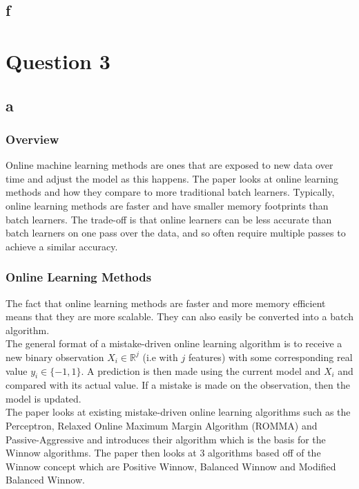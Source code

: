 \documentclass{article}
\begin{document}
\subsection*{f}

\newpage
\section*{Question 3}

\subsection*{a}

\subsubsection*{Overview}

Online machine learning methods are ones that are exposed to new data over time and adjust the model as this happens.
The paper looks at online learning methods and how they compare to more traditional batch learners. Typically, online
learning methods are faster and have smaller memory footprints than batch learners. The trade-off is that online
learners can be less accurate than batch learners on one pass over the data, and so often require multiple passes to achieve a similar 
accuracy.\\

\subsubsection*{Online Learning Methods}

The fact that online learning methods are faster and more memory efficient means that they are more scalable. They can also
easily be converted into a batch algorithm.\\

The general format of a mistake-driven online learning algorithm is to receive a new binary observation \(X_{i} \in \mathbb{R}^{j}\) (i.e with \(j\) features) 
with some corresponding real value \(y_{i} \in \{-1,1\}\). A prediction is then made using the current model and \(X_{i}\) and compared with its actual 
value. If a mistake is made on the observation, then the model is updated.\\

The paper looks at existing mistake-driven online learning algorithms such as the Perceptron, Relaxed Online Maximum Margin Algorithm 
(ROMMA) and Passive-Aggressive and introduces their algorithm which is the basis for the Winnow algorithms. The paper then looks at 3 
algorithms based off of the Winnow concept which are Positive Winnow, Balanced Winnow and Modified Balanced Winnow.\\
\end{document}
